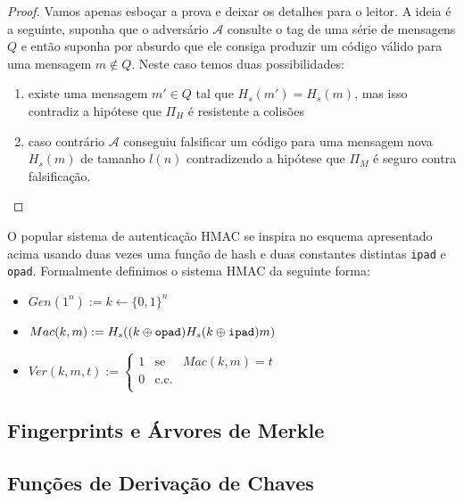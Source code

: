 \begin{proof}
  Vamos apenas esboçar a prova e deixar os detalhes para o leitor.
  A ideia é a seguinte, suponha que o adversário $\mathcal{A}$ consulte o tag de uma série de mensagens $Q$ e então suponha por absurdo que ele consiga produzir um código válido para uma mensagem $m \notin Q$.
  Neste caso temos duas possibilidades:
  \begin{enumerate}
  \item existe uma mensagem $m' \in Q$ tal que $H_s(m') = H_s(m)$, mas isso contradiz a hipótese que $\Pi_H$ é resistente a colisões
  \item caso contrário $\mathcal{A}$ conseguiu falsificar um código para uma mensagem nova $H_s(m)$ de tamanho $l(n)$ contradizendo a hipótese que $\Pi_M$ é seguro contra falsificação.
  \end{enumerate}
\end{proof}


O popular sistema de autenticação HMAC se inspira no esquema apresentado acima usando duas vezes uma função de hash e duas constantes distintas {\tt ipad} e {\tt opad}.
Formalmente definimos o sistema HMAC da seguinte forma:
\begin{itemize}
\item $Gen(1^n) := k \leftarrow \{0,1\}^n$
\item $Mac(k, m) := H_s((k \oplus \textrm{\tt opad}) H_s(k \oplus \textrm{\tt ipad})m)$
\item $Ver(k, m, t) := \left\{
    \begin{array}{lcl}
      1 & \textrm{se} & Mac(k,m) = t\\
      0 & \textrm{c.c.} &\\
    \end{array}
    \right.$
\end{itemize}


\subsection{Fingerprints e Árvores de Merkle}
\label{label}


\subsection{Funções de Derivação de Chaves}
\label{sec:kdf}

